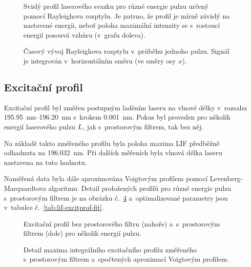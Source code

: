\begin{figure}
	\centering
	
	\caption{Svislý profil laserového svazku pro různé energie pulzu
		určený pomocí Rayleighova rozptylu.
		Je patrno, že profil je mírně závislý na nastavené energii,
		neboť poloha maximální intenzity se s~rostoucí energií posouvá
		vzhůru (v~grafu doleva).}
	\label{fig:lif-rayleigh-profile}
\end{figure}

\begin{figure}
	\centerline{}
	\caption{Časový vývoj Rayleighova rozptylu v~průběhu jednoho pulzu.
		Signál je integrován v~horizontálním směru (ve směry osy $x$).}
	\label{fig:lif-rayleigh-time}
\end{figure}

\subsection{Excitační profil}
\label{sec:lif-excitprof}
Excitační profil byl změřen postupným laděním laseru na vlnové délky
v~rozsahu \SIrange{195.95}{196.20}{\nano\metre}
s~krokem \SI{0.001}{\nano\metre}.
Pokus byl proveden pro několik energií laserového pulzu $L$,
jak s~prostorovým filtrem, tak bez něj.

Na základě takto změřeného profilu byla poloha maxima LIF předběžně
odhadnuta na \SI{196.032}{\nano\metre}.
Při dalších měřeních byla vlnová délka laseru na\-stavena na tuto hodnotu.

Naměřená data byla dále aproximována Voigtovým profilem pomocí
Le\-ven\-berg-Marquardtova algoritmu.
Detail proložených profilů pro různé energie pulzu s~prostorovým filtrem
je na obrázku č.~\ref{fig:lif-excitprof-fit}
a~optimalizované parametry jsou v~tabulce č.~\ref{tab:lif-excitprof-fit}.

\begin{figure}
	\centering
	
	\bigskip\par
	
	\caption{Excitační profil bez prostorového filtru (nahoře)
		a~s~prostorovým filtrem (dole) pro několik energií pulzu.}
	\label{fig:lif-excitprof-filter}
\end{figure}

\begin{figure}
	\centering
	
	\caption{Detail maxima integrálního excitačního profilu
		změřeného s~prostorovým filtrem
		a~spočtených aproximací Voigtovým profilem.}
	\label{fig:lif-excitprof-fit}
\end{figure}

